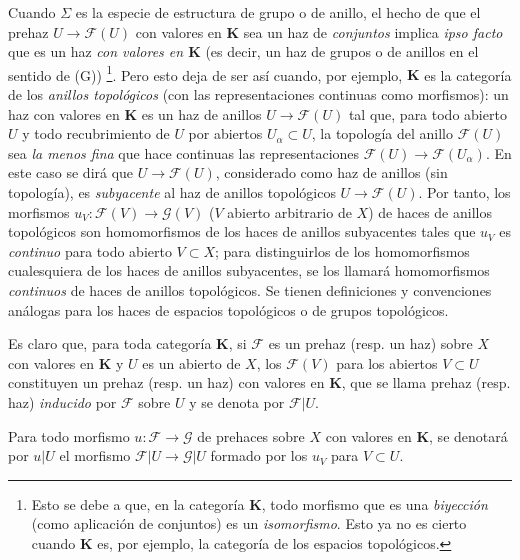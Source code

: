 \begin{env}[3.1.4]
\label{0.3.1.4-fr}
Cuando $\Sigma$ es la especie de estructura de grupo o de anillo, el hecho de que
el prehaz $U\to\mathcal{F}(U)$ con valores en $\boldsymbol{K}$ sea un
haz de \emph{conjuntos} implica \emph{ipso facto} que es un
haz \emph{con valores en $\boldsymbol{K}$} (es decir, un haz de
grupos o de anillos en el sentido de (G))%
\footnote{Esto se debe a que, en la categoría $\boldsymbol{K}$, todo morfismo
que es una \emph{biyección} (como aplicación de conjuntos) es un
\emph{isomorfismo}. Esto ya no es cierto cuando $\boldsymbol{K}$ es, por ejemplo,
la categoría de los espacios topológicos.}. Pero esto deja de ser así
cuando, por ejemplo, $\boldsymbol{K}$ es la categoría de los \emph{anillos
topológicos} (con las representaciones continuas como morfismos): un
haz con valores en $\boldsymbol{K}$ es un haz de anillos
$U\to\mathcal{F}(U)$ tal que, para todo abierto $U$ y todo recubrimiento de $U$
por abiertos $U_\alpha\subset U$, la topología del anillo $\mathcal{F}(U)$
sea \emph{la menos fina} que hace continuas las representaciones
$\mathcal{F}(U)\to\mathcal{F}(U_\alpha)$. En este caso se dirá que
$U\to\mathcal{F}(U)$, considerado como haz de anillos (sin topología), es
\emph{subyacente} al haz de anillos topológicos
$U\to\mathcal{F}(U)$. Por tanto, los morfismos
$u_V:\mathcal{F}(V)\to\mathcal{G}(V)$ ($V$ abierto arbitrario de $X$) de
haces de anillos topológicos son homomorfismos de los haces de
anillos subyacentes tales que $u_V$ es \emph{continuo} para todo abierto
$V\subset X$; para distinguirlos de los homomorfismos cualesquiera de los
haces de anillos subyacentes, se los llamará homomorfismos
\emph{continuos} de haces de anillos topológicos. Se tienen definiciones y
convenciones análogas para los haces de espacios topológicos o de grupos
topológicos.
\end{env}


\begin{env}[3.1.5]
\label{0.3.1.5-fr}
Es claro que, para toda categoría $\boldsymbol{K}$, si $\mathcal{F}$ es un
prehaz (resp. un haz) sobre $X$ con valores en $\boldsymbol{K}$ y $U$ es un
abierto de $X$, los $\mathcal{F}(V)$ para los abiertos $V\subset U$ constituyen
un prehaz (resp. un haz) con valores en $\boldsymbol{K}$, que se
llama prehaz (resp. haz) \emph{inducido} por $\mathcal{F}$ sobre $U$ y
se denota por $\mathcal{F}|U$.

Para todo morfismo $u:\mathcal{F}\to\mathcal{G}$ de prehaces sobre $X$ con
valores en $\boldsymbol{K}$, se denotará por $u|U$ el morfismo
$\mathcal{F}|U\to\mathcal{G}|U$ formado por los $u_V$ para $V\subset U$.
\end{env}

